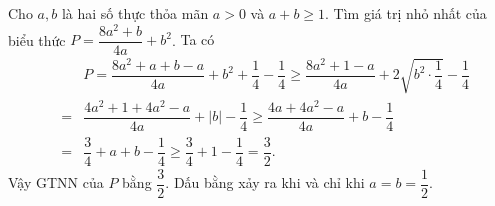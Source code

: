 \begin{ex}%
	Cho $a, b$ là hai số thực thỏa mãn $a> 0$ và $a+b \geq 1$. Tìm giá trị nhỏ nhất của biểu thức $P= \dfrac{8a^2+ b}{4a}+ b^2$.
	\loigiai
	{
	Ta có 
	\begin{eqnarray*}
	&& P= \dfrac{8a^2+ a+ b- a}{4a}+ b^2+ \dfrac{1}{4}- \dfrac{1}{4} \geq \dfrac{8a^2+ 1- a}{4a}+ 2\sqrt{b^2 \cdot \dfrac{1}{4}}- \dfrac{1}{4}\\
	& = & \dfrac{4a^2+ 1+ 4a^2- a}{4a}+ |b|- \dfrac{1}{4} \geq \dfrac{4a+ 4a^2- a}{4a}+ b- \dfrac{1}{4}\\
	& = & \dfrac{3}{4}+ a+ b- \dfrac{1}{4} \geq \dfrac{3}{4}+ 1- \dfrac{1}{4}= \dfrac{3}{2}. 
\end{eqnarray*}
	Vậy GTNN của $P$ bằng $\dfrac{3}{2}$. Dấu bằng xảy ra khi và chỉ khi $a= b= \dfrac{1}{2}$.	
	}
\end{ex}

